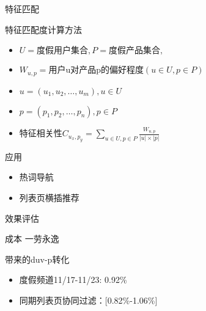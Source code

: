 \documentclass{beamer}
\begin{document}
\begin{CJK}{UTF8}{gbsn}
\begin{frame}{特征匹配}
\end{frame}

\begin{frame}{特征匹配度计算方法}
  \begin{itemize}
    \item { $ U=\text{度假用户集合}, P=\text{度假产品集合}, $ }
    \item { $ W_{u,p}=\text{用户u对产品p的偏好程度}(u \in U, p \in P) $ }
    \item { $ u=(u_1, u_2, \dots , u_m), u \in U $ }
    \item { $ p=(p_1, p_2, \dots , p_n), p \in P $ }
    \item { $ \text{特征相关性}C_{u_x,p_y} = \sum_{u \in U, p \in P}{\frac{W_{u,p}}{|u| \times |p|}}$ }
  \end{itemize}
\end{frame}


\begin{frame}{应用}
  \begin{itemize}
  \item {热词导航}
  \item {列表页横插推荐}
  \end{itemize}
\end{frame}

\begin{frame}{效果评估}
  \begin{block}{成本}
    一劳永逸
  \end{block}

  \begin{block}{带来的duv-p转化}
    \begin{itemize}
    \item {度假频道11/17-11/23: 0.92\%}
    \item {同期列表页协同过滤：[0.82\%-1.06\%]}
    \end{itemize}
  \end{block}

\end{frame}


\end{CJK}
\end{document}
